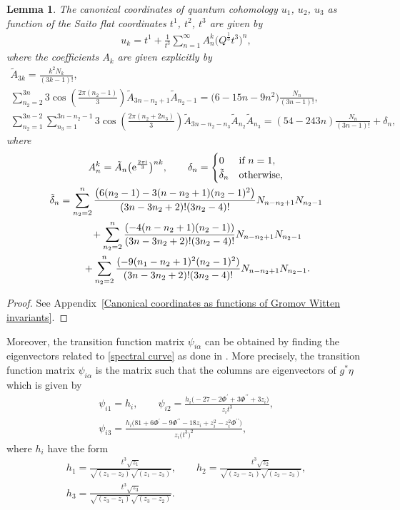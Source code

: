 \documentclass[11pt]{article}
\numberwithin{equation}{section}
\numberwithin{equation}{section}
\newtheorem{Lemma}[Theorem]{Lemma}
\begin{document}
\begin{Lemma}
The canonical coordinates of quantum cohomology $u_1$, $u_2$, $u_3$ as function of the Saito flat coordinates $t^1$, $t^2$, $t^3$ are given by
\begin{gather}\label{canonical coordinates lemma1}
u_k=t^1+\frac{1}{t^3}\sum_{n=1}^{\infty} A_n^k \bigl( Q^{\frac{1}{3}}t^3 \bigr)^n,
\end{gather}
where the coefficients $A_{k}$ are given explicitly by
\begin{gather*}
\tilde A_{3k}=\frac{k^2N_k}{(3k-1)! },\\
\sum_{n_2=2}^{3n}3\cos\left( \frac{2\pi (n_2-1)}{3}\right) \tilde A_{3n-n_2+1} \tilde A_{n_2-1}=\bigl(6-15n-9n^2 \bigr)\frac{N_n}{(3n-1)!},\\
\sum_{n_2=1}^{3n-2}\sum_{n_3=1}^{3n-n_2-1}3\cos\left( \frac{2\pi (n_2+2n_3 )}{3} \right) \tilde A_{3n-n_2-n_3} \tilde A_{n_2} \tilde A_{n_3}=(54-243n )\frac{N_n}{(3n-1)!}+\delta_{n} ,
\end{gather*}
where
\begin{gather*}
A_n^k=\tilde A_n \bigl( {\rm e}^{\frac{2\pi {\rm i}}{3}}\bigr)^{nk},
\qquad
\delta_n=
\begin{cases}
0& \text{if } n=1,\\
 \tilde\delta_n & \text{otherwise},
\end{cases}
\\
\tilde\delta_n=\sum_{n_2=2}^{n}\frac{\bigl(6(n_2-1)-3(n-n_2+1)(n_2-1)^2 \bigr)}{(3n-3n_2+2)!(3n_2-4)!} N_{n-n_2+1}N_{n_2-1}\\
\phantom{\tilde\delta_n=}{}+\sum_{n_2=2}^{n}\frac{(-4(n-n_2+1)(n_2-1) )}{(3n-3n_2+2)!(3n_2-4)!} N_{n-n_2+1}N_{n_2-1}\\
\phantom{\tilde\delta_n=}{}+\sum_{n_2=2}^{n}\frac{(-9(n_1-n_2+1)^2(n_2-1)^2 )}{(3n-3n_2+2)!(3n_2-4)!} N_{n-n_2+1}N_{n_2-1}.
\end{gather*}
\end{Lemma}

\begin{proof}
See Appendix~\ref{Canonical coordinates as functions of Gromov Witten invariants}.
\end{proof}

Moreover, the transition function matrix $\psi_{i \alpha}$ can be obtained by finding the eigenvectors related to \eqref{spectral curve} as done in \cite[Example 3.10.34]{B.Dubrovin4}. More precisely, the transition function matrix $\psi_{i \alpha}$ is the matrix such that the columns are eigenvectors of
$g^{*}\eta$
which is given by
\begin{gather*}
\psi_{i1}=h_i,\qquad
\psi_{i2}=\frac{h_i\bigl( -27-2\Phi^{\prime}+3\Phi^{\prime\prime} +3z_i \bigr)}{z_it^3},\\
\psi_{i3}=\frac{h_i\bigl( 81+6\Phi^{\prime}-9\Phi^{\prime\prime}-18z_i+z_i^2-z_i^2\Phi^{\prime\prime} \bigr)}{z_i\bigl(t^3\bigr)^2},
\end{gather*}
where $h_i$ have the form
\begin{gather*}
h_1=\frac{t^3\sqrt{z_1}}{\sqrt{(z_1-z_2)}\sqrt{(z_1-z_3)}}, \qquad h_2=\frac{t^3\sqrt{z_2}}{\sqrt{(z_2-z_1)}\sqrt{(z_2-z_3)}}, \\ h_3=\frac{t^3\sqrt{z_3}}{\sqrt{(z_3-z_1)}\sqrt{(z_3-z_2)}}.
\end{gather*}
\end{document}
